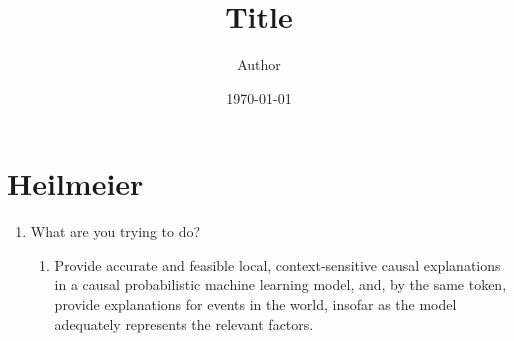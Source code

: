 \documentclass{article}
\title{Title}
\author{Author}
\date{\today}
\begin{document}
\maketitle

\section{Heilmeier}

\begin{enumerate}
    \item What are you trying to do?
    \begin{enumerate}
        \item Provide accurate and feasible local, context-sensitive causal explanations in a causal probabilistic machine learning model, and, by the same token, provide explanations for events in the world, insofar as the model adequately represents the relevant factors.
        

\end{enumerate}
\end{enumerate}
\end{document}
